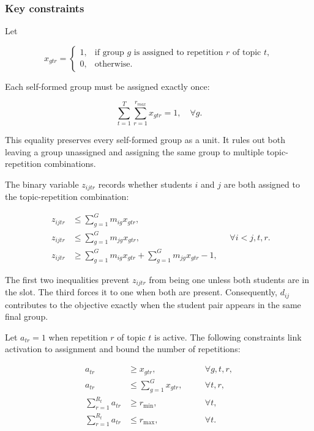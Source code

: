 \subsubsection{Key constraints}\label{key-constraints}

Let

\[
x_{gtr}=
\begin{cases}
1,&\text{if group \(g\) is assigned to repetition \(r\) of topic \(t\)},\\
0,&\text{otherwise.}
\end{cases}
\]

Each self-formed group must be assigned exactly once:

\[
\sum_{t=1}^{T}\sum_{r=1}^{r_{max}}x_{gtr}=1,\quad \forall g. \tag{1}
\]

This equality preserves every self-formed group as a unit. It rules out both
leaving a group unassigned and assigning the same group to multiple
topic-repetition combinations.

The binary variable \(z_{ijtr}\) records whether students \(i\) and \(j\) are
both assigned to the topic-repetition combination:

\[
\begin{aligned}
z_{ijtr}&\leq\sum_{g=1}^{G}m_{ig}x_{gtr},\\
z_{ijtr}&\leq\sum_{g=1}^{G}m_{jg}x_{gtr},\\
z_{ijtr}&\geq\sum_{g=1}^{G}m_{ig}x_{gtr}
             +\sum_{g=1}^{G}m_{jg}x_{gtr}-1,
\end{aligned}
\quad \forall i<j,t,r. \tag{2}
\]

The first two inequalities prevent \(z_{ijtr}\) from being one unless both
students are in the slot. The third forces it to one when both are present.
Consequently, \(d_{ij}\) contributes to the objective exactly when the student
pair appears in the same final group.

Let \(a_{tr}=1\) when repetition \(r\) of topic \(t\) is active. The following
constraints link activation to assignment and bound the number of repetitions:

\[
\begin{aligned}
a_{tr}&\geq x_{gtr},&&\quad \forall g,t,r,\\
a_{tr}&\leq\sum_{g=1}^{G}x_{gtr},&&\quad \forall t,r,\\
\sum_{r=1}^{R_t}a_{tr}&\geq r_{\min},&&\quad \forall t,\\
\sum_{r=1}^{R_t}a_{tr}&\leq r_{\max},&&\quad \forall t.
\end{aligned} \tag{3}
\]

